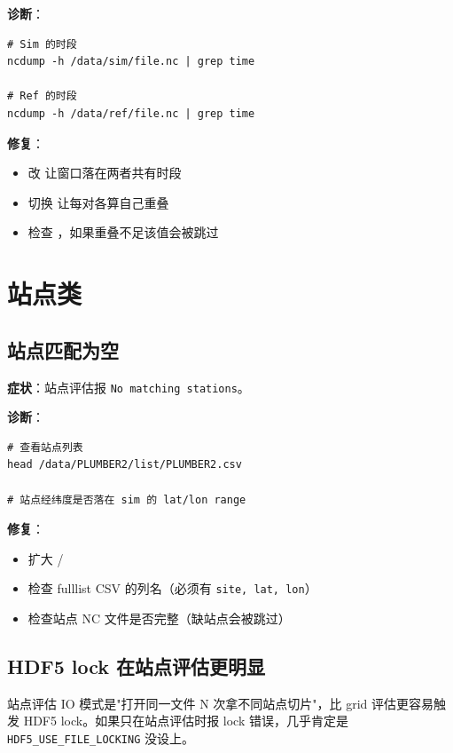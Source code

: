 \textbf{诊断}：

\begin{verbatim}
# Sim 的时段
ncdump -h /data/sim/file.nc | grep time

# Ref 的时段
ncdump -h /data/ref/file.nc | grep time
\end{verbatim}

\textbf{修复}：

\begin{itemize}
  \item 改  让窗口落在两者共有时段
  \item 切换  让每对各算自己重叠
  \item 检查 ，如果重叠不足该值会被跳过
\end{itemize}

\section{站点类}

\subsection{站点匹配为空}

\textbf{症状}：站点评估报 \texttt{No matching stations}。

\textbf{诊断}：

\begin{verbatim}
# 查看站点列表
head /data/PLUMBER2/list/PLUMBER2.csv

# 站点经纬度是否落在 sim 的 lat/lon range
\end{verbatim}

\textbf{修复}：

\begin{itemize}
  \item 扩大  / 
  \item 检查 fulllist CSV 的列名（必须有 \texttt{site, lat, lon}）
  \item 检查站点 NC 文件是否完整（缺站点会被跳过）
\end{itemize}

\subsection{HDF5 lock 在站点评估更明显}

站点评估 IO 模式是"打开同一文件 N 次拿不同站点切片"，比 grid 评估更容易触发 HDF5 lock。如果只在站点评估时报 lock 错误，几乎肯定是 \texttt{HDF5\_USE\_FILE\_LOCKING} 没设上。

